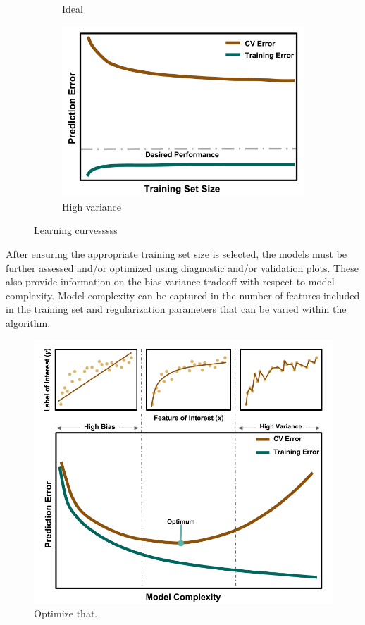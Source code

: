 \begin{figure}[!hp]
\begin{subfigure}[h]{0.65\linewidth}
    \caption{Ideal}
    \label{fig:ideal}
  \end{subfigure}
  \begin{subfigure}[h]{0.65\linewidth}
    \centering
    \includegraphics[width=\linewidth]{./chapters/litrev/LearningCurve-variance.png}
    \caption{High variance}
    \label{fig:variance}
  \end{subfigure}
  \caption{Learning curvesssss}
  \label{fig:learning}
\end{figure}

After ensuring the appropriate training set size is selected, the models must
be further assessed and/or optimized using diagnostic and/or validation plots.
These also provide information on the bias-variance tradeoff with respect to
model complexity. Model complexity can be captured in the number of features
included in the training set and regularization parameters that can be varied
within the algorithm. 

\begin{figure}[!htb]
  \includegraphics[width=\linewidth]{./chapters/litrev/ValidationCurve.png}
  \caption{Optimize that.}
  \label{fig:validation}
\end{figure}

